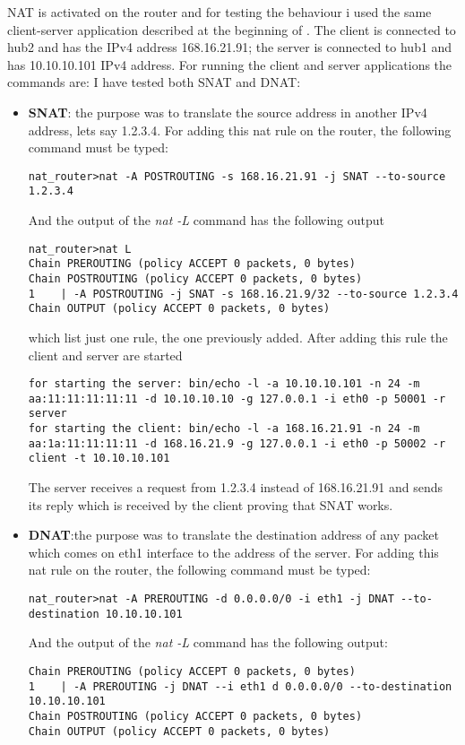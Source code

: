{{NAT is activated on the router and for testing the behaviour i used the same client-server application described at the beginning of . The client is connected to hub2 and has the IPv4 address 168.16.21.91; the server is connected to hub1 and has 10.10.10.101 IPv4 address.
For running the client and server applications the commands are:
I have tested both SNAT and DNAT:
\begin{itemize}
\item \textbf{SNAT}: the purpose was to translate the source address in another IPv4 address, lets say 1.2.3.4.
For adding this nat rule on the router, the following command must be typed:
\lstset{language=TeX, caption=Add rule SNAT}
\begin{lstlisting}
nat_router>nat -A POSTROUTING -s 168.16.21.91 -j SNAT --to-source 1.2.3.4
\end{lstlisting}
And the output of the \textit{nat -L} command has the following output
\lstset{language=TeX, caption=List all rules for standard NAT chains}
\begin{lstlisting}
nat_router>nat L
Chain PREROUTING (policy ACCEPT 0 packets, 0 bytes)
Chain POSTROUTING (policy ACCEPT 0 packets, 0 bytes)
1	 | -A POSTROUTING -j SNAT -s 168.16.21.9/32 --to-source 1.2.3.4
Chain OUTPUT (policy ACCEPT 0 packets, 0 bytes)
\end{lstlisting}

which list just one rule, the one previously added. 
After adding this rule the client and server are started
\lstset{language=TeX, caption=SNAT-starting client and server applications}
\begin{lstlisting}
for starting the server: bin/echo -l -a 10.10.10.101 -n 24 -m aa:11:11:11:11:11 -d 10.10.10.10 -g 127.0.0.1 -i eth0 -p 50001 -r server 
for starting the client: bin/echo -l -a 168.16.21.91 -n 24 -m aa:1a:11:11:11:11 -d 168.16.21.9 -g 127.0.0.1 -i eth0 -p 50002 -r client -t 10.10.10.101
\end{lstlisting}
 The server receives a request from 1.2.3.4 instead of 168.16.21.91 and sends its reply which is received by the client proving that SNAT works.
\item \label{nat-impl:DNAT} \textbf{DNAT}:the purpose was to translate the destination address of any packet which comes on eth1 interface to the address of the server.
For adding this nat rule on the router, the following command must be typed:
\lstset{language=TeX, caption=Add rule SNAT}
\begin{lstlisting}
nat_router>nat -A PREROUTING -d 0.0.0.0/0 -i eth1 -j DNAT --to-destination 10.10.10.101
\end{lstlisting}
And the output of the \textit{nat -L} command has the following output:
\lstset{language=TeX, caption=List all rules for standard NAT chains}
\begin{lstlisting}
Chain PREROUTING (policy ACCEPT 0 packets, 0 bytes)
1	 | -A PREROUTING -j DNAT --i eth1 d 0.0.0.0/0 --to-destination 10.10.10.101
Chain POSTROUTING (policy ACCEPT 0 packets, 0 bytes)
Chain OUTPUT (policy ACCEPT 0 packets, 0 bytes)
\end{lstlisting}


\end{itemize}}}
